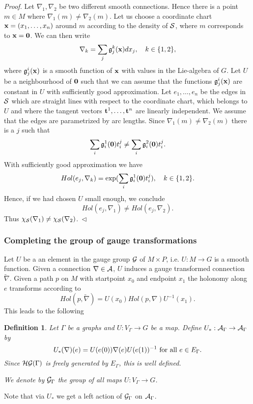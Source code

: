 \documentclass[12pt]{article}
\newcommand{\eproof}{{~\hfill$ \triangleleft$}}
\def\ca{{\cal A}}
\def\cg{{\cal G}}
\def\ch{{\cal H}}
\def\cs{{\cal S}}
\newtheorem{definition}[thm]{Definition}
\begin{document}
{\textit{Proof.} Let $\nabla_1,\nabla_2$ be two different smooth connections. Hence there is a point $m\in M$ where $\nabla_1 (m) \ne \nabla_2 (m)$. Let us choose a coordinate chart ${\bf{x}}=(x_1,\ldots , x_n)$ around $m$ according to the density of $\cs$, where $m$ corresponds to $\bf{x}=0$. We can then write
$$\nabla_k=\sum_j \mathfrak{g}_j^k({\bf{x}})dx_j, \quad k\in \{ 1,2\},$$
where $ \mathfrak{g}_j^i({\bf{x}})$ is a smooth function of $\bf{x}$ with values in the Lie-algebra of $G$. Let $U$ be a neighbourhood of $\bf{0}$ such that we can assume that the functions $ \mathfrak{g}_j^i({\bf{x}})$ are constant in $U$ with sufficiently good approximation. Let $e_1,\ldots , e_n$ be the edges in $\cs$ which are straight lines with respect to the coordinate chart, which belongs to $U$ and where the tangent vectors ${\bf{t}}^1,\ldots,{\bf{t}}^n$ are linearly independent. We assume that the edges are parametrized by arc lengths.   Since $\nabla_1(m)\ne \nabla_2(m)$ there is a $j$ such that 
$$ \sum_i \mathfrak{g}_i^1({\bf{0}})t^j_i \ne \sum_i\mathfrak{g}_i^2({\bf{0}})t^j_i.  $$ 
 With sufficiently good approximation we have 
$$Hol(e_j ,\nabla_k)=\exp ( \sum_i \mathfrak{g}_i^1({\bf{0}})t^j_i),\quad k\in \{1,2\}.$$
Hence, if we had chosen $U$ small enough, we conclude 
 $$Hol(e_j,\nabla_1)\ne Hol (e_j,\nabla_2).$$
Thus $\chi_\cs (\nabla_1)\ne \chi_\cs (\nabla_2)$.\eproof

\subsubsection{Completing the group of gauge transformations} \label{gauge}
Let $U$ be a an element in the gauge group $\cg$ of $M\times P$, i.e. $U:M\to G$ is a smooth function. Given a connection $\nabla \in \ca$, $U$ induces a gauge transformed connection $\tilde{\nabla}$. Given a path $p$ on $M$ with startpoint $x_0$ and endpoint $x_1$ the holonomy along $e$ transforms according to 
$$Hol (p,\tilde{\nabla})=U(x_0)Hol(p,\nabla )U^{-1}(x_1).$$
This leads to the following 
\begin{definition}
 Let $\Gamma$ be a graphs and $U:V_\Gamma \to G$  be a map. Define $U_*:\ca_\Gamma \to \ca_\Gamma$ by
$$U_*(\nabla )(e)=U(e(0))\nabla (e)U(e(1))^{-1}\hbox{ for all } e\in E_\Gamma.$$
Since $\ch\cg (\Gamma)$ is freely generated by $E_\Gamma$, this is well defined.

We denote by $\cg_\Gamma$ the group of all maps $U:V_\Gamma \to G$.
\end{definition}

Note that via $U_*$ we get a left action of $\cg_\Gamma$ on $\ca_\Gamma$. 

}
\end{document}
